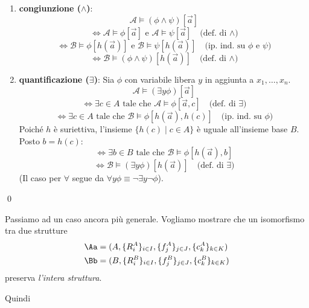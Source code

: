 \documentclass[a4paper,11pt]{report}
\begin{document}
\begin{pframe}
\begin{itemize}
\begin{enumerate}
        \item \textbf{congiunzione ($\land$)}:
        \[ \mathcal{A} \models (\phi \land \psi)[\vec{a}] \]
        \[ \iff \mathcal{A} \models \phi[\vec{a}] \text{ e } \mathcal{A} \models \psi[\vec{a}] \quad \text{(def. di } \land) \]
        \[ \iff \mathcal{B} \models \phi[h(\vec{a})] \text{ e } \mathcal{B} \models \psi[h(\vec{a})] \quad \text{(ip. ind. su } \phi \text{ e } \psi) \]
        \[ \iff \mathcal{B} \models (\phi \land \psi)[h(\vec{a})] \quad \text{(def. di } \wedge) \]

        \item \textbf{quantificazione ($\exists$)}:
        Sia \(\phi\) con variabile libera \(y\) in aggiunta a \(x_1, \ldots, x_n\).
        \[ \mathcal{A} \models (\exists y \phi)[\vec{a}] \]
        \[ \iff \exists c \in A \text{ tale che } \mathcal{A} \models \phi[\vec{a}, c] \quad \text{(def. di } \exists) \]
        \[ \iff \exists c \in A \text{ tale che } \mathcal{B} \models \phi[h(\vec{a}), h(c)] \quad \text{(ip. ind. su } \phi) \]
        Poiché \(h\) è suriettiva, l'insieme \(\{h(c) \mid c \in A\}\) è uguale all'insieme base \(B\). Posto \(b = h(c)\):
        \[ \iff \exists b \in B \text{ tale che } \mathcal{B} \models \phi[h(\vec{a}), b] \]
        \[ \iff \mathcal{B} \models (\exists y \phi)[h(\vec{a})] \quad \text{(def. di } \exists) \]
        (Il caso per \(\forall\) segue da \(\forall y \phi \equiv \neg \exists y \neg \phi\)).
            \end{enumerate}
    \end{itemize} \qed
\end{pframe}

Passiamo ad un caso ancora più generale. Vogliamo mostrare che un isomorfismo tra due strutture 
\begin{align*}
    \Aa &= (A, \{R_i^A\}_{i\in I}, \{f_j^A\}_{j\in J},\{c_k^A\}_{k\in K} ) \\
    \Bb &= (B, \{R_i^B\}_{i\in I}, \{f_j^B\}_{j\in J},\{c_k^B\}_{k\in K} ) 
\end{align*}
preserva \textit{l'intera struttura}.

Quindi
\end{document}
